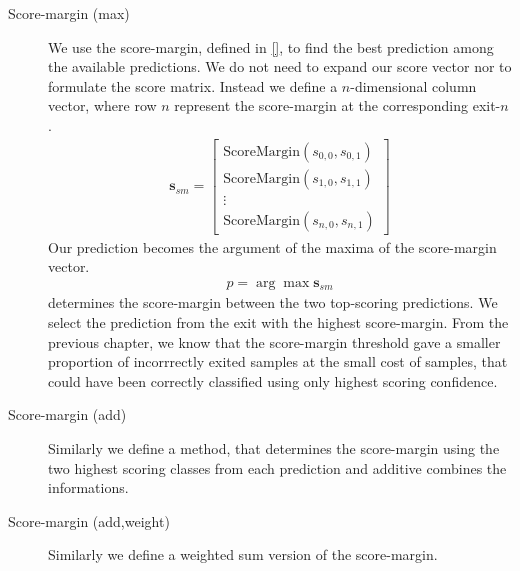 \begin{description}
	\item[Score-margin (max)] We use the score-margin, defined in \ref{}, to find the best prediction among the available predictions. We do not need to expand our score vector nor to formulate the score matrix. Instead we define a $n$-dimensional column vector, where row $n$ represent the score-margin at the corresponding exit-$n$.  
	\begin{align*}
		\mathbf{s}_{sm} = \begin{bmatrix}
			\mathrm{ScoreMargin}(s_{0,0}, s_{0,1}) \\
			\mathrm{ScoreMargin}(s_{1,0}, s_{1,1}) \\
			\vdots \\
			\mathrm{ScoreMargin}(s_{n,0}, s_{n,1})
		\end{bmatrix}
	\end{align*}
	Our prediction becomes the argument of the maxima of the score-margin vector.
	\begin{align*}
		p = \arg \max \mathbf{s}_{sm}
	\end{align*}
	determines the score-margin between the two top-scoring predictions. We select the prediction from the exit with the highest score-margin. From the previous chapter, we know that the score-margin threshold gave a smaller proportion of incorrrectly exited samples at the small cost of samples, that could have been correctly classified using only highest scoring confidence.	
	\item[Score-margin (add)] Similarly we define a method, that determines the score-margin using the two highest scoring classes from each prediction and additive combines the informations.
	
	\item[Score-margin (add,weight)] Similarly we define a weighted sum version of the score-margin. 
\end{description}

